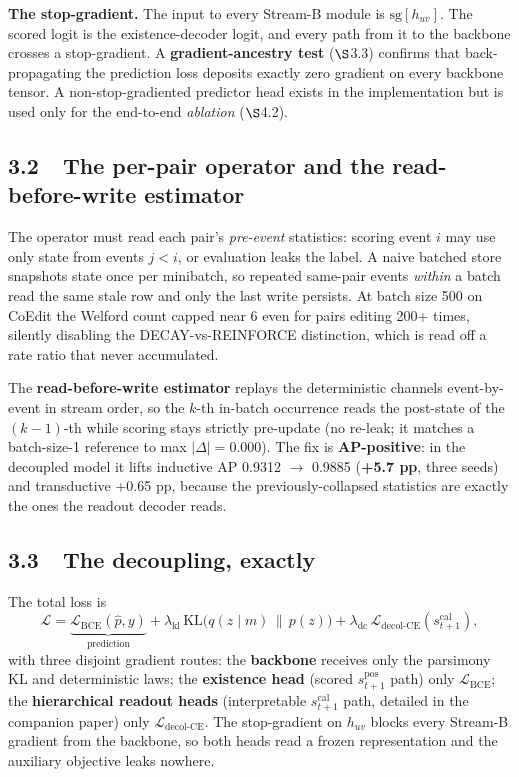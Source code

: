 \documentclass[conference]{IEEEtran}
\begin{document}
\textbf{The stop-gradient.} The input to every Stream-B module is \(\mathrm{sg}[h_{uv}]\). The scored logit is the existence-decoder logit, and every path from it to the backbone crosses a stop-gradient. A \textbf{gradient-ancestry test} ($\S$3.3) confirms that back-propagating the prediction loss deposits exactly zero gradient on every backbone tensor. A non-stop-gradiented predictor head exists in the implementation but is used only for the end-to-end \emph{ablation} ($\S$4.2).

\subsection*{3.2~~The per-pair operator and the read-before-write estimator}

The operator must read each pair's \emph{pre-event} statistics: scoring event \(i\) may use only state from events \(j < i\), or evaluation leaks the label. A naive batched store snapshots state once per minibatch, so repeated same-pair events \emph{within} a batch read the same stale row and only the last write persists. At batch size 500 on CoEdit the Welford count capped near 6 even for pairs editing 200+ times, silently disabling the DECAY-vs-REINFORCE distinction, which is read off a rate ratio that never accumulated.

The \textbf{read-before-write estimator} replays the deterministic channels event-by-event in stream order, so the \(k\)-th in-batch occurrence reads the post-state of the \((k{-}1)\)-th while scoring stays strictly pre-update (no re-leak; it matches a batch-size-1 reference to max \(|\Delta|=0.000\)). The fix is \textbf{AP-positive}: in the decoupled model it lifts inductive AP 0.9312 $\rightarrow$ 0.9885 (\textbf{+5.7 pp}, three seeds) and transductive +0.65 pp, because the previously-collapsed statistics are exactly the ones the readout decoder reads.

\subsection*{3.3~~The decoupling, exactly}

The total loss is
{\small
\[
\mathcal{L} = \underbrace{\mathcal{L}_{\text{BCE}}(\hat{p}, y)}_{\text{prediction}} + \lambda_{\text{kl}}\,\mathrm{KL}\big(q(z\mid m)\,\|\,p(z)\big) + \lambda_{\text{dc}}\,\mathcal{L}_{\text{decol-CE}}(s_{t+1}^{\text{cal}}) ,
\]}%
with three disjoint gradient routes: the \textbf{backbone} receives only the parsimony KL and deterministic laws; the \textbf{existence head} (scored \(s^{\text{pos}}_{t+1}\) path) only \(\mathcal{L}_{\text{BCE}}\); the \textbf{hierarchical readout heads} (interpretable \(s^{\text{cal}}_{t+1}\) path, detailed in the companion paper) only \(\mathcal{L}_{\text{decol-CE}}\). The stop-gradient on \(h_{uv}\) blocks every Stream-B gradient from the backbone, so both heads read a frozen representation and the auxiliary objective leaks nowhere.
\end{document}
